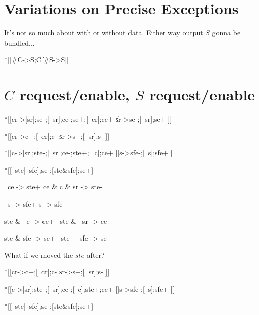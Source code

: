\documentclass{article}
\begin{document}

\section{Variations on Precise Exceptions}

It's not so much about with or without data. 
Either way output $S$ gonna be bundled...

\begin{csp}
*[[#C->S;C
  \|#S->S]]
\end{csp}


\section{$C$ request/enable, $S$ request/enable}

\begin{hse}
*[[cr->[sr];se-;[~sr];ce-;se+;[~cr];ce+
  \|sr->se-;[~sr];se+
 ]]
\end{hse}

\begin{hse}
*[[cr->c+;[~cr];c-
  \|sr->s+;[~sr];s-
 ]]

*[[c->[sr];ste-;[~sr];ce-;ste+;[~c];ce+
  []s->sfe-;[~s];sfe+
 ]]

*[[~ste|~sfe];se-;[ste&sfe];se+]
\end{hse}

\begin{prs2}
~ce -> ste+
ce & c & sr -> ste-

~s -> sfe+
s -> sfe-
\end{prs2}

\begin{prs2}
ste & ~c -> ce+
~ste & ~sr -> ce-
\end{prs2}

\begin{prs2}
ste & sfe -> se+
~ste | ~sfe -> se-
\end{prs2}

What if we moved the $ste$ after?

\begin{hse}
*[[cr->c+;[~cr];c-
  \|sr->s+;[~sr];s-
 ]]

*[[c->[sr];ste-;[~sr];ce-;[~c];ste+;ce+
  []s->sfe-;[~s];sfe+
 ]]

*[[~ste|~sfe];se-;[ste&sfe];se+]
\end{hse}
\end{document}

